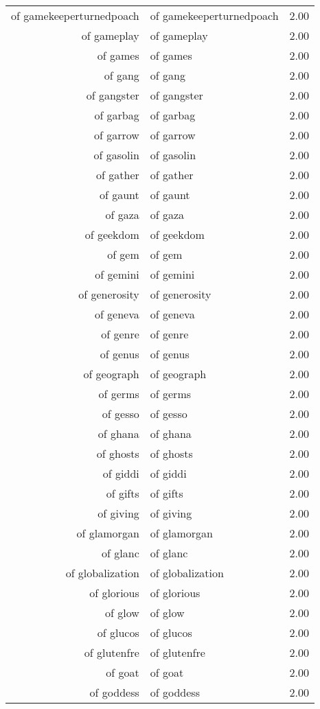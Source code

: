 \begin{table}[ht]
\begin{tabular}{rlr}
  of gamekeeperturnedpoach & of gamekeeperturnedpoach & 2.00 \\ 
  of gameplay & of gameplay & 2.00 \\ 
  of games & of games & 2.00 \\ 
  of gang & of gang & 2.00 \\ 
  of gangster & of gangster & 2.00 \\ 
  of garbag & of garbag & 2.00 \\ 
  of garrow & of garrow & 2.00 \\ 
  of gasolin & of gasolin & 2.00 \\ 
  of gather & of gather & 2.00 \\ 
  of gaunt & of gaunt & 2.00 \\ 
  of gaza & of gaza & 2.00 \\ 
  of geekdom & of geekdom & 2.00 \\ 
  of gem & of gem & 2.00 \\ 
  of gemini & of gemini & 2.00 \\ 
  of generosity & of generosity & 2.00 \\ 
  of geneva & of geneva & 2.00 \\ 
  of genre & of genre & 2.00 \\ 
  of genus & of genus & 2.00 \\ 
  of geograph & of geograph & 2.00 \\ 
  of germs & of germs & 2.00 \\ 
  of gesso & of gesso & 2.00 \\ 
  of ghana & of ghana & 2.00 \\ 
  of ghosts & of ghosts & 2.00 \\ 
  of giddi & of giddi & 2.00 \\ 
  of gifts & of gifts & 2.00 \\ 
  of giving & of giving & 2.00 \\ 
  of glamorgan & of glamorgan & 2.00 \\ 
  of glanc & of glanc & 2.00 \\ 
  of globalization & of globalization & 2.00 \\ 
  of glorious & of glorious & 2.00 \\ 
  of glow & of glow & 2.00 \\ 
  of glucos & of glucos & 2.00 \\ 
  of glutenfre & of glutenfre & 2.00 \\ 
  of goat & of goat & 2.00 \\ 
  of goddess & of goddess & 2.00 \\ 

\end{tabular}
\end{table}
